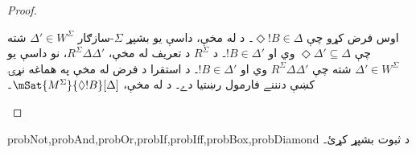 \documentclass[../../../include/open-logic-section]{subfiles}
\begin{document}
\begin{proof}
\begin{enumerate}
{{{          اوس فرض کړو چې $\Diamond !B \in \Delta$۔ د
           له مخې، داسې يو بشپړ
          $\Sigma$-سازګار $\Delta' \in W^\Sigma$ شته چې
          $\Diamond \Delta' \subseteq \Delta$ وي او $!B \in
          \Delta'$۔ د
          $R^\Sigma$ د تعريف له مخې، $R^\Sigma \Delta\Delta'$، نو داسې
          يو $\Delta' \in W^\Sigma$ شته چې $R^\Sigma
          \Delta\Delta'$ وي او $!B \in \Delta'$۔ د استقرا د فرض
          له مخې په هماغه نړۍ کښې دنننے فارمول رښتيا دے۔ د
           له مخې، $\mSat{M^\Sigma}{\Diamond
            !B}[\Delta]$۔}}}{}
  \end{enumerate}
\end{proof}

\begin{probtag}{probNot,probAnd,probOr,probIf,probIff,probBox,probDiamond}
  د  ثبوت بشپړ کړئ۔
\end{probtag}
\end{document}
